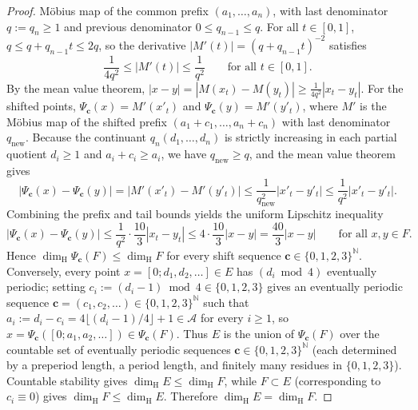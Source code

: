 \documentclass[11pt]{article}
\theoremstyle{definition}
\theoremstyle{remark}
\newcommand{\N}{\mathbb{N}}
\newcommand{\dimH}{\dim_{\mathrm{H}}}
\begin{document}
\begin{proof}
M\"obius map of the common prefix $(a_1,\dots,a_n)$, with last denominator
$q:=q_n\ge1$ and previous denominator $0\le q_{n-1}\le q$. For all $t\in[0,1]$,
$q\le q+q_{n-1}t\le 2q$, so the derivative $|M'(t)|=(q+q_{n-1}t)^{-2}$ satisfies
\[
\frac{1}{4q^2}\le |M'(t)|\le\frac{1}{q^2}\qquad\text{for all }t\in[0,1].
\]
By the mean value theorem, $|x-y|=|M(x_t)-M(y_t)|\ge\frac{1}{4q^2}|x_t-y_t|$.
For the shifted points, $\Psi_{\mathbf c}(x)=M'(x'_t)$ and
$\Psi_{\mathbf c}(y)=M'(y'_t)$, where $M'$ is the M\"obius map of the shifted
prefix $(a_1+c_1,\dots,a_n+c_n)$ with last denominator $q_{\mathrm{new}}$.
Because the continuant $q_n(d_1,\dots,d_n)$ is strictly increasing in each
partial quotient $d_i\ge1$ and $a_i+c_i\ge a_i$, we have
$q_{\mathrm{new}}\ge q$, and the mean value theorem gives
\[
\bigl|\Psi_{\mathbf c}(x)-\Psi_{\mathbf c}(y)\bigr|
=\bigl|M'(x'_t)-M'(y'_t)\bigr|
\le\frac{1}{q_{\mathrm{new}}^2}|x'_t-y'_t|
\le\frac{1}{q^2}|x'_t-y'_t|.
\]
Combining the prefix and tail bounds yields the uniform Lipschitz inequality
\[
\bigl|\Psi_{\mathbf c}(x)-\Psi_{\mathbf c}(y)\bigr|
\le\frac{1}{q^2}\cdot\frac{10}{3}|x_t-y_t|
\le 4\cdot\frac{10}{3}|x-y|=\frac{40}{3}|x-y|\qquad\text{for all }x,y\in F.
\]
Hence $\dimH\Psi_{\mathbf c}(F)\le\dimH F$ for every shift sequence
$\mathbf c\in\{0,1,2,3\}^{\N}$. Conversely, every point
$x=[0;d_1,d_2,\ldots]\in E$ has $(d_i\bmod4)$ eventually periodic; setting
$c_i:=(d_i-1)\bmod4\in\{0,1,2,3\}$ gives an eventually periodic sequence
$\mathbf c=(c_1,c_2,\dots)\in\{0,1,2,3\}^{\N}$ such that
$a_i:=d_i-c_i=4\lfloor(d_i-1)/4\rfloor+1\in\mathcal A$ for every $i\ge1$, so
$x=\Psi_{\mathbf c}([0;a_1,a_2,\dots])\in\Psi_{\mathbf c}(F)$. Thus $E$ is the
union of $\Psi_{\mathbf c}(F)$ over the countable set of eventually periodic
sequences $\mathbf c\in\{0,1,2,3\}^{\N}$ (each determined by a preperiod length,
a period length, and finitely many residues in $\{0,1,2,3\}$). Countable
stability gives $\dimH E\le\dimH F$, while $F\subset E$ (corresponding to
$c_i\equiv0$) gives $\dimH F\le\dimH E$. Therefore $\dimH E=\dimH F$.


\end{proof}
\end{document}
